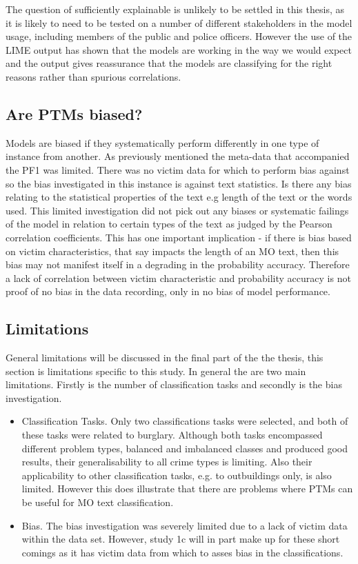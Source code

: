 The question of sufficiently explainable is unlikely to be settled in this thesis, as it is likely to need to be tested on a number of different stakeholders in the model usage, including members of the public and police officers. However the use of the LIME output has shown that the models are working in the way we would expect and the output gives reassurance that the models are classifying for the right reasons rather than spurious correlations. 


\subsection{Are PTMs biased?} Models are biased if they systematically perform differently in one type of instance from another. As previously mentioned the meta-data that accompanied the PF1 was limited. There was no victim data for which to perform bias against so the bias investigated in this instance is against text statistics. Is there any bias relating to the statistical properties of the text e.g length of the text or the words used. This limited investigation did not pick out any biases or systematic failings of the model in relation to certain types of the text as judged by the Pearson correlation coefficients. This has one important implication - if there is bias based on victim characteristics, that say impacts the length of an MO text, then this bias may not manifest itself in a degrading in the probability accuracy. Therefore a lack of correlation between victim characteristic and probability accuracy is not proof of no bias in the data recording, only in no bias of model performance. 


\subsection{Limitations} General limitations will be discussed in the final part of the the thesis, this section is limitations specific to this study. In general the are two main limitations. Firstly is the number of classification tasks and secondly is the bias investigation.

\begin{itemize}
    \item Classification Tasks. Only two classifications tasks were selected, and both of these tasks were related to burglary. Although both tasks encompassed different problem types, balanced and imbalanced classes and produced good results, their generalisability to all crime types is limiting. Also their applicability to other classification tasks, e.g. to outbuildings only, is also limited. However this does illustrate that there are problems where PTMs can be useful for MO text classification.
    
    \item Bias. The bias investigation was severely limited due to a lack of victim data within the data set. However, study 1c will in part  make up for these short comings as it has victim data from which to asses bias in the classifications. 
    
\end{itemize}

